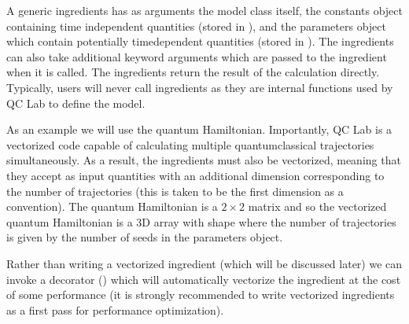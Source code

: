 \documentclass[letterpaper,10pt,english]{sphinxmanual}
\begin{document}
\sphinxAtStartPar
A generic ingredients has as arguments the model class itself, the constants object containing time independent quantities (stored in ), and
the parameters object which contain potentially time\sphinxhyphen{}dependent quantities (stored in ). The ingredients can also take additional keyword arguments
which are passed to the ingredient when it is called. The ingredients return the result of the calculation directly. Typically, users will never call ingredients as they
are internal functions used by QC Lab to define the model.

\sphinxAtStartPar
As an example we will use the quantum Hamiltonian. Importantly, QC Lab is a vectorized code capable of calculating multiple quantum\sphinxhyphen{}classical trajectories simultaneously.
As a result, the ingredients must also be vectorized, meaning that they accept as input quantities with an additional dimension corresponding to the number of trajectories
(this is taken to be the first dimension as a convention). The quantum Hamiltonian is a \(2\times 2\) matrix and so the vectorized quantum Hamiltonian is a 3D array with shape
 where the number of trajectories is given by the number of seeds in the parameters object.

\sphinxAtStartPar
Rather than writing a vectorized ingredient (which will be discussed later) we can invoke a decorator () which will automatically vectorize the ingredient
at the cost of some performance (it is strongly recommended to write vectorized ingredients as a first pass for performance optimization).

\begin{sphinxVerbatim}[commandchars=\\\{\}]
   

    
      
      
     \PYG{p}{[}\PYG{p}{[} \PYG{p}{]} \PYG{p}{[} \PYG{p}{]}\PYG{p}{]} 
\end{sphinxVerbatim}
\end{document}
